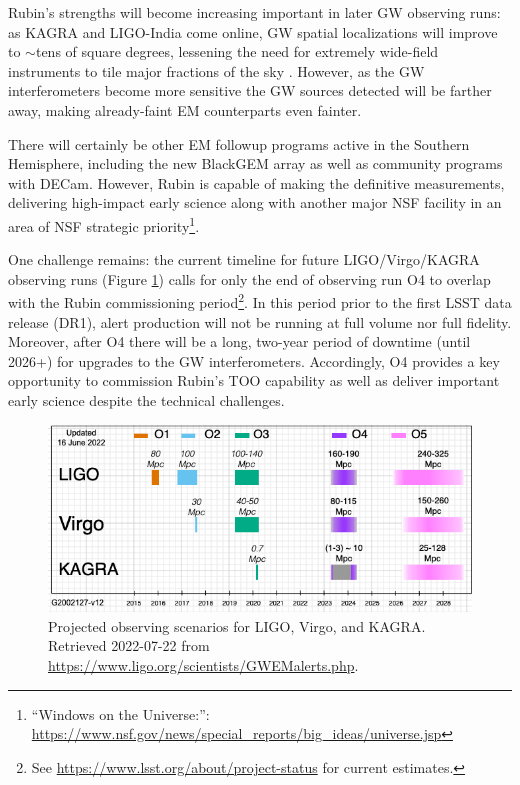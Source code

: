 \documentclass[DM,authoryear,toc]{lsstdoc}
\begin{document}
Rubin's strengths will become increasing important in later GW observing runs: 
as KAGRA and LIGO-India come online, GW spatial localizations will improve to $\sim$tens of square degrees, lessening the need for extremely wide-field instruments to tile major fractions of the sky \citep{2022ApJ...924...54P}.  
However, as the GW interferometers become more sensitive the GW sources detected will be farther away, making already-faint EM counterparts even fainter.

There will certainly be other EM followup programs active in the Southern Hemisphere, including the new BlackGEM array as well as community programs with DECam.
However, Rubin is capable of making the definitive measurements, delivering high-impact early science along with another major NSF facility in an area of NSF strategic priority\footnote{``Windows on the Universe:'': \url{https://www.nsf.gov/news/special_reports/big_ideas/universe.jsp}}.

One challenge remains: the current timeline for future LIGO/Virgo/KAGRA observing runs (Figure \ref{fig:scenarios}) calls for only the end of observing run O4 to overlap with the Rubin commissioning period\footnote{See \url{https://www.lsst.org/about/project-status} for current estimates.}.
In this period prior to the first LSST data release (DR1), alert production will not be running at full volume nor full fidelity.
Moreover, after O4 there will be a long, two-year period of downtime (until 2026+) for upgrades to the GW interferometers.  
Accordingly, O4 provides a key opportunity to commission Rubin's TOO capability as well as deliver important early science despite the technical challenges.

\begin{figure}
\includegraphics[width=\textwidth]{figures/LVK_run_plan_220615.png}
\caption{Projected observing scenarios for LIGO, Virgo, and KAGRA.  Retrieved 2022-07-22 from 
\url{https://www.ligo.org/scientists/GWEMalerts.php}.
	\label{fig:scenarios}}
\end{figure}
\end{document}
